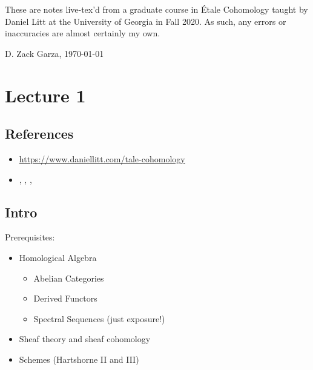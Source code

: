 \newpage

\tableofcontents
\newpage

These are notes live-tex'd from a graduate course in Étale Cohomology
taught by Daniel Litt at the University of Georgia in Fall 2020. As
such, any errors or inaccuracies are almost certainly my own.

\medskip
\begin{flushright}
  D. Zack Garza, \today \\
  \currenttime
\end{flushright}

\hypertarget{lecture-1}{%
\section{Lecture 1}\label{lecture-1}}

\hypertarget{references}{%
\subsection{References}\label{references}}

\begin{itemize}
\tightlist
\item
  \url{https://www.daniellitt.com/tale-cohomology}
\item
  \autocite{milneLEC}, \autocite{milne_2017},
  \autocite{freitag_kiehl_2013}, \autocite{katz}
\end{itemize}

\hypertarget{intro}{%
\subsection{Intro}\label{intro}}

Prerequisites:

\begin{itemize}
\tightlist
\item
  Homological Algebra

  \begin{itemize}
  \tightlist
  \item
    Abelian Categories
  \item
    Derived Functors
  \item
    Spectral Sequences (just exposure!)
  \end{itemize}
\item
  Sheaf theory and sheaf cohomology
\item
  Schemes (Hartshorne II and III)
\end{itemize}

